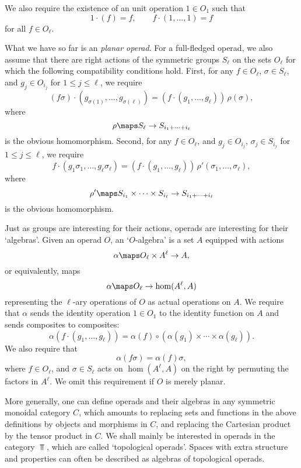 \noindent We also require the existence of an unit operation $1 \in O_1$
such that
\[     1 \cdot (f) = f, \qquad f \cdot (1,\dots, 1) = f \]
for all $f \in O_\ell$.  

What we have so far is an {\it planar operad}.   For a
full-fledged operad, we also assume that there are right actions of
the symmetric groups $S_\ell$ on the sets $O_\ell$ for which the
following compatibility conditions hold.  First, for any $f \in O_\ell$,
$\sigma \in S_\ell$, and $g_j \in O_{i_j}$ for $1 \le j \le \ell$, we
require
\[     (f\sigma) \cdot (g_{\sigma(1)}, \dots, g_{\sigma(\ell)} ) = 
(f \cdot (g_1, \dots, g_\ell))\, \rho(\sigma), \]
where
\[      \rho \maps S_\ell \to S_{i_1 + \cdots + i_\ell}  \]
is the obvious homomorphism.  
Second, for any $f \in O_\ell$, and $g_j \in O_{i_j}$, $\sigma_j
\in S_{i_j}$ for $1 \le j \le \ell$, we require
\[     f \cdot (g_1\sigma_1, \dots, g_\ell \sigma_\ell) = 
(f \cdot (g_1, \dots, g_\ell))\, \rho'(\sigma_1,\dots,\sigma_\ell), \]
where
\[      \rho' \maps S_{i_1} \times \cdots \times S_{i_\ell}
\to S_{i_1 + \cdots + i_\ell} \]
is the obvious homomorphism. 

Just as groups are interesting for their actions, operads are 
interesting for their `algebras'.  Given an operad $O$, an
`$O$-algebra' is a set $A$ equipped with actions
\[      \alpha \maps O_\ell \times A^\ell \to A, \] 
or equivalently, maps
\[      \alpha \maps O_\ell \to \hom(A^\ell,A) \] 
representing the $\ell$-ary operations of $O$ as actual operations on
$A$.  We require that $\alpha$ sends the identity operation $1
\in O_1$ to the identity function on $A$ and sends composites to
composites: 
\[      \alpha(f \cdot
(g_1, \dots, g_\ell)) = \alpha(f) \circ (\alpha(g_1) \times \cdots \times
\alpha(g_\ell)) .\] 
We also require that
\[        \alpha(f\sigma) = \alpha(f)\sigma, \] 
where $f \in O_\ell$, and $\sigma \in S_\ell$ acts on $\hom(A^\ell,A)$ on the
right by permuting the factors in $A^\ell$.  We omit this requirement if
$O$ is merely planar.

More generally, one can define operads and their algebras in any
symmetric monoidal category $C$, which amounts to replacing sets and
functions in the above definitions by objects and morphisms in $C$, and
replacing the Cartesian product by the tensor product in $C$.  We shall
mainly be interested in operads in the category $\Top$, which are called
`topological operads'.  Spaces with extra structure and properties can 
often be described as algebras of topological operads.

